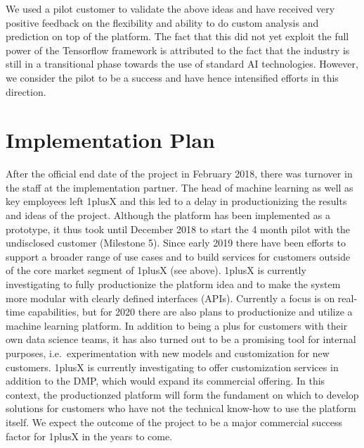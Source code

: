 \documentclass{article}
\begin{document}
We used a pilot customer to validate the above ideas and have received very positive feedback on the flexibility and ability to do custom analysis and prediction on top of the platform. The fact that this did not yet exploit the full power of the Tensorflow framework is attributed to the fact that the industry is still in a transitional phase towards the use of standard AI technologies. However, we consider the pilot to be a success and have hence intensified efforts in this direction.

\section{Implementation Plan} 

After the official end date of the project in February 2018, there was  turnover in the staff at the implementation partner. The head of machine learning as well as key employees left 1plusX and this led to a delay in productionizing the results and ideas of the project. Although the platform has been implemented as a prototype, it thus took until December 2018 to start the 4 month pilot with the undisclosed customer (Milestone 5). Since early 2019 there have been efforts to support a broader range of use cases and to build services for customers outside of the core market segment of 1plusX (see above). 1plusX is currently investigating to fully productionize the platform idea and to make the system more modular with clearly defined interfaces (APIs). Currently a focus is on real-time capabilities, but for 2020 there are also plans to productionize and utilize a machine learning platform. In addition to being a plus for customers with their own data science teams, it has also turned out to be a promising tool for internal purposes, i.e.~experimentation with new models and customization for new customers. 1plusX is currently investigating to offer customization services in addition to the DMP, which would expand its commercial offering. In this context, the productionzed platform will form the fundament on which to develop solutions for customers who have not the technical know-how to use the platform itself. We expect the outcome of the project to be a major commercial success factor for 1plusX in the years to come.
\end{document}
